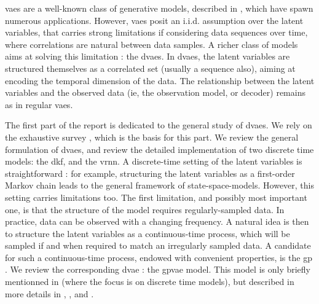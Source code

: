 

\glspl{vae} are a well-known class of generative models, described in \cite{kingma_introduction_2019}, which have spawn numerous applications. 
However, \glspl{vae} posit an i.i.d. assumption over the latent variables, that carries strong limitations if considering data sequences over time, 
where correlations are natural between data samples. A richer class of models aims at solving this limitation : the \glspl{dvae}.
In \glspl{dvae}, the latent variables are structured themselves as a correlated set (usually a sequence also), 
aiming at encoding the temporal dimension of the data. The relationship between the latent variables and the observed data (ie, the observation model,
or decoder) remains as in regular \glspl{vae}.

The first part of the report is dedicated to the general study of \glspl{dvae}. We rely on the exhaustive survey \cite{girin_dynamical_2022},
which is the basis for this part. We review the general formulation of \glspl{dvae}, and review the detailed implementation of two discrete time models:
 the \gls{dkf}, and the \gls{vrnn}. A discrete-time setting of the latent variables is straightforward : for example, 
 structuring the latent variables as a first-order Markov chain leads to the general framework of \glspl{state-space-model}.
 However, this setting carries limitations too. The first limitation, and possibly most important one, 
 is that the structure of the model requires regularly-sampled data. In practice, data can be observed with a changing frequency. 
 A natural idea is then to structure the latent variables as a continuous-time process, which will be sampled if and when 
 required to match an irregularly sampled data. A candidate for such a continuous-time process, endowed with convenient properties, 
 is the \gls{gp} \cite{rasmussen_gaussian_2008}. We review the corresponding \gls{dvae} : the \gls{gpvae} model.
 This model is only briefly mentionned in \cite{girin_dynamical_2022} (where the focus is on discrete time models), 
 but described in more details in \cite{casale_gaussian_2018}, \cite{fortuin_gp-vae:_2020}, \cite{titsias_bayesian_2010} 
 and \cite{zhu_markovian_2023}. 


